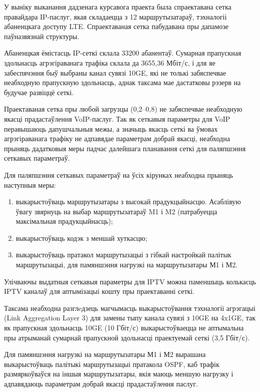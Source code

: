 
У выніку выканання дадзенага курсавога праекта была спраектавана
сетка правайдара IP-паслуг, якая складаецца з 12 маршрутызатараў,
тэхналогіі абаненцкага доступу LTE. Спраектаваная сетка пабудавана
пры дапамозе паўназвязнай структуры.

Абаненцкая ёмістасць IP-сеткі склала 33200 абанентаў.
Сумарная прапускная здольнасць агрэгіраванага трафіка склала да
3655,36 Мбіт/с, і для яе забеспячэння быў выбраны канал сувязі 10GE,
які не толькі забяспечвае неабходную прапускную здольнасць, аднак
таксама мае дастатковы рэзерв на будучае развіццё сеткі.

Праектаваная сетка пры любой загрузцы (0,2--0,8) не забяспечвае
неабходную якасці прадастаўлення VoIP-паслуг.
Так як сеткавыя параметры для VoIP перавышаюць дапушчальныя межы,
а значыць якасць сеткі ва ўмовах агрэгіраванага трафіку не адпавядае
параметрам добрай якасці,
неабходна прыняць дадатковыя меры падчас далейшага планавання
сеткі для паляпшэння сеткавых параметраў.

Для паляпшэння сеткавых параметраў на ўсіх кірунках неабходна
прыняць наступныя меры:
\begin{enumerate}
    \item выкарыстоўваць маршрутызатары з высокай прадукцыйнасцю.
          Асаблівую ўвагу звярнуць на выбар маршрутызатараў
          M1 і M2 (патрабуецца максімальная прадукцыйнасць);
    \item выкарыстоўваць кодэк з меншай хуткасцю;
    \item выкарыстоўваць пратакол маршрутызацыі з гібкай настройкай
          палітык маршрутызацыі, для памяншэння нагрузкі на
          маршрутызатары М1 і М2.
\end{enumerate}

Улічваючы выдатныя сеткавыя параметры для IPTV можна паменшыць
колькасць IPTV каналаў для аптымізацыі кошту пры праектаванні сеткі.

Таксама неабходна разглeдзець магчымасць выкарыстоўвання тэхналогіі
агрэгацыі (Link Aggregation Layer 3) для замены тыпу канала сувязі з
10GE на 4x1GE, так як прапускная здольнасць
10GE (10 Гбіт/с) выкарыстоўваецца
не аптымальна пры атрыманай сумарнай прапускной здольнасці
праектуемай сеткі (3,5 Гбіт/с).

Для памяншэння нагрузкі на маршрутызатары М1 і М2 вырашана
выкарыстоўваць палітыкі маршрутызацыі пратакола OSPF, каб
трафік размяркоўваўся на іншыя маршрутызатары, якія
маюць меншую нагрузку і адпавядаюць параметрам добрай якасці
прадастаўлення паслуг.

